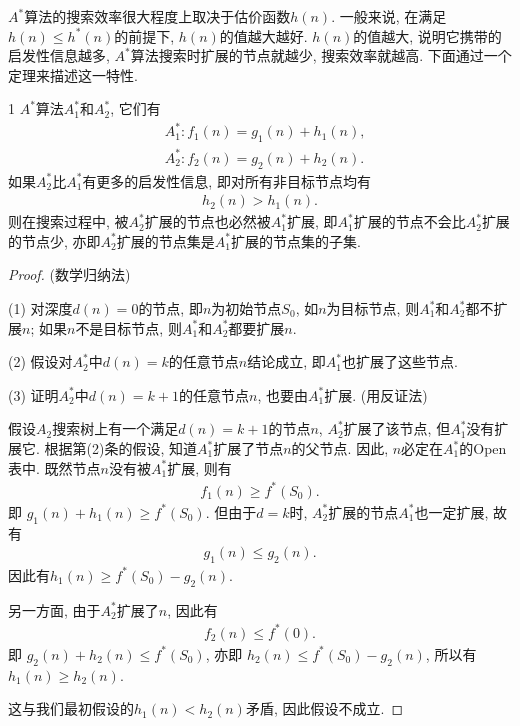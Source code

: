 $A^*$算法的搜索效率很大程度上取决于估价函数$h(n)$. 一般来说, 在满足$h(n) \leq h^*(n)$的前提下, $h(n)$的值越大越好. $h(n)$的值越大, 说明它携带的启发性信息越多, $A^*$算法搜索时扩展的节点就越少, 搜索效率就越高.
下面通过一个定理来描述这一特性.
\begin{mythm}{}{1}
    $A^*$算法$A_1^*$和$A_2^*$, 它们有
\begin{align}
    &A_1^*:  f_1(n)=g_1(n)+h_1(n),\\
    &A_2^*:  f_2(n)=g_2(n)+h_2(n).
\end{align}
如果$A_2^*$比$A_1^*$有更多的启发性信息, 即对所有非目标节点均有
\begin{align}
     h_2(n)>h_1(n).
\end{align}
则在搜索过程中, 被$A_2^*$扩展的节点也必然被$A_1^*$扩展, 即$A_1^*$扩展的节点不会比$A_2^*$扩展的节点少, 亦即$A_2^*$扩展的节点集是$A_1^*$扩展的节点集的子集.
\end{mythm}
\begin{proof}
(数学归纳法)

(1) 对深度$d(n)=0$的节点, 即$n$为初始节点$S_0$, 如$n$为目标节点, 则$A_1^*$和$A_2^*$都不扩展$n$; 如果$n$不是目标节点, 则$A_1^*$和$A_2^*$都要扩展$n$.

(2) 假设对$A_2^*$中$d(n)=k$的任意节点$n$结论成立, 即$A_1^*$也扩展了这些节点.

(3) 证明$A_2^*$中$d(n)=k+1$的任意节点$n$, 也要由$A_1^*$扩展. (用反证法)

假设$A_2$搜索树上有一个满足$d(n)=k+1$的节点$n$, $A_2^*$扩展了该节点, 但$A_1^*$没有扩展它. 根据第(2)条的假设, 知道$A_1^*$扩展了节点$n$的父节点. 因此, $n$必定在$A_1^*$的Open表中. 既然节点$n$没有被$A_1^*$扩展, 则有
\begin{align}
     f_1(n)\geq f^*(S_0).
\end{align}
即 $g_1(n)+h_1(n)\geq f^*(S_0)$. 但由于$d=k$时, $A_2^*$扩展的节点$A_1^*$也一定扩展, 故有
\begin{align}
    g_1(n)\leq g_2(n).
\end{align}
因此有$h_1(n)\geq f^*(S_0)-g_2(n)$.

另一方面, 由于$A_2^ *$扩展了$n$, 因此有
\begin{align}
     f_2(n)\leq f^*(0).
\end{align}
即   $g_2(n)+h_2(n)\leq f^*(S_0)$, 亦即 $h_2(n)\leq f^*(S_0)-g_2(n)$, 所以有 $ h_1(n)\geq h_2(n)$.

这与我们最初假设的$h_1(n)<h_2(n)$矛盾, 因此假设不成立.
\end{proof}

